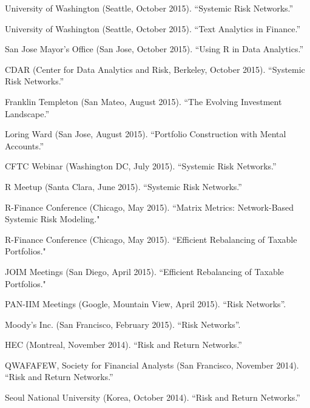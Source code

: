 \documentclass{article}
\begin{document}
\begin{etaremune}
{\item University of Washington (Seattle, October 2015). ``Systemic Risk Networks.''

\item University of Washington (Seattle, October 2015). ``Text Analytics in Finance.''

\item San Jose Mayor's Office (San Jose, October 2015). ``Using R in Data Analytics.''

\item CDAR (Center for Data Analytics and Risk, Berkeley, October 2015). ``Systemic Risk Networks.''

\item Franklin Templeton (San Mateo, August 2015). ``The Evolving Investment Landscape.''

\item Loring Ward (San Jose, August 2015). ``Portfolio Construction with Mental Accounts.''

\item CFTC Webinar (Washington DC, July 2015). ``Systemic Risk Networks.''

\item R Meetup (Santa Clara, June 2015). ``Systemic Risk Networks.''

\item R-Finance Conference (Chicago, May 2015). ``Matrix Metrics: Network-Based Systemic Risk Modeling."

\item R-Finance Conference (Chicago, May 2015). ``Efficient Rebalancing of Taxable Portfolios."

\item JOIM Meetings (San Diego, April 2015). ``Efficient Rebalancing of Taxable Portfolios."

\item PAN-IIM Meetings  (Google, Mountain View, April 2015). ``Risk Networks''.

\item Moody's Inc.  (San Francisco, February 2015). ``Risk Networks''.

\item HEC (Montreal, November 2014). ``Risk and Return Networks.''

\item QWAFAFEW, Society for Financial Analysts (San Francisco, November 2014). ``Risk and Return Networks.''

\item Seoul National University (Korea, October 2014). ``Risk and Return Networks.''

}
\end{etaremune}
\end{document}
